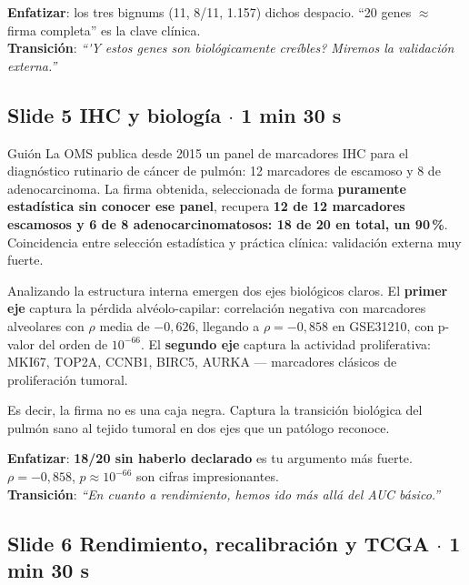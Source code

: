 \documentclass[11pt, a4paper]{article}
\newcommand{\slidebadge}[1]{{\colorbox{verdeTerm}{\color{white}\bfseries\;#1\;}}}
\begin{document}
\textbf{Enfatizar}: los tres bignums (11, 8/11, 1.157) dichos despacio. ``20 genes $\approx$ firma completa'' es la clave cl\'inica.\\
\textbf{Transici\'on}: \emph{``\'{}Y estos genes son biol\'ogicamente cre\'ibles? Miremos la validaci\'on externa.''}

\subsection*{\slidebadge{Slide 5} IHC y biolog\'ia $\cdot$ 1 min 30 s}

\begin{guioncaja}{Gui\'on}
La OMS publica desde 2015 un panel de marcadores IHC para el diagn\'ostico rutinario de c\'ancer de pulm\'on: 12 marcadores de escamoso y 8 de adenocarcinoma. La firma obtenida, seleccionada de forma \textbf{puramente estad\'istica sin conocer ese panel}, recupera \textbf{12 de 12 marcadores escamosos y 6 de 8 adenocarcinomatosos: 18 de 20 en total, un 90\,\%}. Coincidencia entre selecci\'on estad\'istica y pr\'actica cl\'inica: validaci\'on externa muy fuerte.

Analizando la estructura interna emergen dos ejes biol\'ogicos claros. El \textbf{primer eje} captura la p\'erdida alv\'eolo-capilar: correlaci\'on negativa con marcadores alveolares con $\rho$ media de $-0{,}626$, llegando a $\rho = -0{,}858$ en GSE31210, con p-valor del orden de $10^{-66}$. El \textbf{segundo eje} captura la actividad proliferativa: MKI67, TOP2A, CCNB1, BIRC5, AURKA --- marcadores cl\'asicos de proliferaci\'on tumoral.

Es decir, la firma no es una caja negra. Captura la transici\'on biol\'ogica del pulm\'on sano al tejido tumoral en dos ejes que un pat\'ologo reconoce.
\end{guioncaja}

\textbf{Enfatizar}: \textbf{18/20 sin haberlo declarado} es tu argumento m\'as fuerte. $\rho = -0{,}858$, $p \approx 10^{-66}$ son cifras impresionantes.\\
\textbf{Transici\'on}: \emph{``En cuanto a rendimiento, hemos ido m\'as all\'a del AUC b\'asico.''}

\subsection*{\slidebadge{Slide 6} Rendimiento, recalibraci\'on y TCGA $\cdot$ 1 min 30 s}
\end{document}

